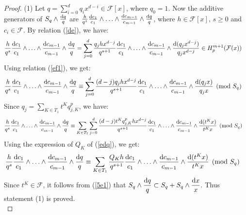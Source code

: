 \documentclass[times,10pt]{amsart}
\newcommand{\N}{\ensuremath{\mathbb{N}}}
\newcommand{\dd}{{\rm d}}
\newcommand{\F}{\ensuremath{\mathcal{F}}}
\begin{document}
    \begin{proof}
        (1)    Let  $q= \sum_{i=0}^{d} q_i x^{d-i}\in \F[x]$, where $q_0=1$.     Now the additive generators of $ {S_q\wedge \frac{\dd q}{q}}$ are  $ \frac{h}{q^s} \frac{\dd c_1}{c_1}\wedge \ldots\wedge \frac{\dd c_{m-1}}{c_{m-1}}\wedge \frac{\dd q}{q}$, where $ h\in \F[x]$, $s\geq 0$ and $c_i\in \F$. By  relation (\ref{de}),  we have: \begin{align*}
            \frac{h}{q^s}\frac{\dd c_1}{c_1}\wedge \ldots\wedge \frac{\dd c_{m-1}}{c_{m-1}}\wedge \frac{\dd q}{q}&= \sum_{j=0}^{d}\frac{ q_jhx^{d-j}}{q^{s+1}}\frac{\dd c_1}{c_1}\wedge\ldots\wedge \frac{\dd c_{m-1}}{c_{m-1}}\wedge \frac{\dd (q_jx^{d-j})}{q_jx^{d-j}}\in H_p^{m+1}(\F(x))\end{align*}
           Using relation (\ref{ef1}), we get: 
            \begin{align*} \frac{h}{q^s}\frac{\dd c_1}{c_1}\wedge \ldots\wedge \frac{\dd c_{m-1}}{c_{m-1}}\wedge \frac{\dd q}{q}
            &\equiv   \sum_{j=0}^{d}\frac{(d-j) q_jhx^{d-j} }{q^{s+1}} \frac{\dd c_1}{c_1}\wedge \ldots\wedge \frac{\dd c_{m-1}}{c_{m-1}}\wedge \frac{\dd (q_j x)}{q_j x}\pmod{S_q}\end{align*}
        { Since $ q_j=\sum_{K\in T_1} t^K q^p_{j,K} $, we have:}\begin{align*} \frac{h}{q^s}\frac{\dd c_1}{c_1}\wedge \ldots\wedge \frac{\dd c_{m-1}}{c_{m-1}}\wedge \frac{\dd q}{q}&\equiv  \sum_{K\in T_1} \sum_{j=0}^{d}\frac{ (d-j) t^Kq^p_{j,K}h x^{d-j}}{ q^{s+1}} \frac{\dd c_1}{c_1}\wedge \ldots\wedge \frac{\dd c_{m-1}}{c_{m-1}}\wedge \frac{\dd (t^K x)}{t^Kx}\pmod{S_q}\end{align*}Using the expression of $Q_K$  of (\ref{edq}), we get: \begin{align}\label{5e1}
            \frac{h}{q^s}\frac{\dd c_1}{c_1}\wedge \ldots\wedge \frac{\dd c_{m-1}}{c_{m-1}}\wedge \frac{\dd q}{q}&\equiv \sum_{K\in T_1} \frac{Q_Kh}{q^{s+1}} \frac{\dd c_1}{c_1}\wedge \ldots\wedge \frac{\dd c_{m-1}}{c_{m-1}}\wedge \frac{\dd (t^K x)}{t^Kx}\pmod{S_q} 
        \end{align} Since $t^K\in \F$,   it follows from (\ref{5e1}) that  $\displaystyle{ S_q\wedge \frac{\dd q}{q}\subset S_q+ S_q\wedge \frac{\dd x}{x}}$. Thus statement (1) is proved.\\


\end{proof}
\end{document}

